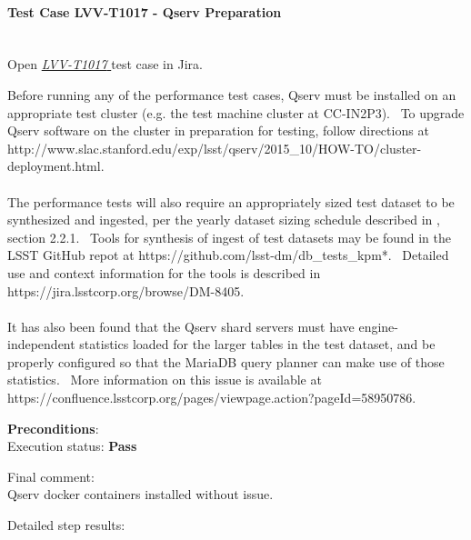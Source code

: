 \documentclass[DM,STR,toc]{lsstdoc}
\begin{document}
    \paragraph{Test Case LVV-T1017 - Qserv Preparation
 }\mbox{}\\

Open  \href{https://jira.lsstcorp.org/secure/Tests.jspa#/testCase/LVV-T1017}{\textit{ LVV-T1017 } }
test case in Jira.

    Before running any of the performance test cases, Qserv must be
installed on an appropriate test cluster (e.g. the test machine cluster
at CC-IN2P3). ~To upgrade Qserv software on the cluster in preparation
for testing, follow directions at
http://www.slac.stanford.edu/exp/lsst/qserv/2015\_10/HOW-TO/cluster-deployment.html.\\
~\\
The performance tests will also require an appropriately sized test
dataset to be synthesized and ingested, per the yearly dataset sizing
schedule described in , section 2.2.1. ~Tools for synthesis of
ingest of test datasets may be found in the LSST GitHub repot at
https://github.com/lsst-dm/db\_tests\_kpm*. ~Detailed use and context
information for the tools is described in
https://jira.lsstcorp.org/browse/DM-8405.\\
~\\
It has also been found that the Qserv shard servers must have
engine-independent statistics loaded for the larger tables in the test
dataset, and be properly configured so that the MariaDB query planner
can make use of those statistics. ~More information on this issue is
available at
https://confluence.lsstcorp.org/pages/viewpage.action?pageId=58950786.


    \textbf{ Preconditions}:\\
    

    Execution status: {\bf Pass }

    Final comment:\\Qserv docker containers installed without issue.



    Detailed step results:
\end{document}
